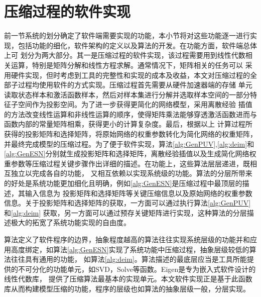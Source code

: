 \section{压缩过程的软件实现}
前一节系统的划分确定了软件端需要实现的功能，本小节将对这些功能逐一进行实现，包括功能的细化，软件架构的定义以及算法的开发。在功能方面，软件端总体上可
划分为两大部分。其一是压缩过程的软件实现，该过程需要用到线性代数相关运算，特别是矩阵分解和线性方程求解。通常情况下，矩阵相关的任务可以
采用硬件实现，但时考虑到工具的完整性和实现的成本及收益，本文对压缩过程的全部子过程均使用软件的方式实现。压缩过程首先需要从硬件加速器端的存储
单元读取状态样本和激活函数样本，然后对样本集进行分解并选取样本空间的一部分特征子空间作为投影空间。为了进一步获得更简化的网络模型，采用离散经验
插值的方法改变线性运算和非线性运算的顺序，使得矩阵乘法能够穿透激活函数进而与函数内部的常量矩阵相乘，获得更小的计算复杂度。最后，根据以上
计算过程所获得的投影矩阵和选择矩阵，将原始网络的权重参数转化为简化网络的权重矩阵，并最终完成模型的压缩过程。为了便于软件实现，算法\ref{alg:GenPUV},\ref{alg:deim}和
\ref{alg:GenESN}分别就生成投影矩阵和选择矩阵，离散经验插值以及生成简化网络权重参数等压缩过程关键步骤作出详细的描述。在功能上，这些算法层层递进，既相互独立以完成各自的功能，
又相互依赖以实现系统级的功能。算法的分层所带来的好处是系统功能更加细化且明确，例如\ref{alg:GenESN}是压缩过程中最顶层的描述，其输入信息为
投影矩阵和选择矩阵等关键压缩信息以及原始网络的权重参数信息。关于投影矩阵和选择矩阵的获取，一方面可以通过执行算法\ref{alg:GenPUV}和\ref{alg:deim}
获取，另一方面可以通过预存关键矩阵进行实现，这种算法的分层描述极大的拓宽了系统功能实现的自由度。


算法定义了软件程序的边界，抽象程度越高的算法往往实现系统层级的功能并和应用高度绑定，如算法\ref{alg:GenESN}实现了系统功能中压缩过程，抽象层级较低的算法往往具有通用的功能，
如算法\ref{alg:deim}。算法描述的最底层应当是工具所能提供的不可分化的功能单元，如SVD，Solve等函数。Eigen是专为嵌入式软件设计的线性代数库，
提供了压缩算法最基本的实现单元。本文软件实现正是基于此函数库从而构建模型压缩的功能，程序的层级也如算法的抽象层级一般，分层实现。

